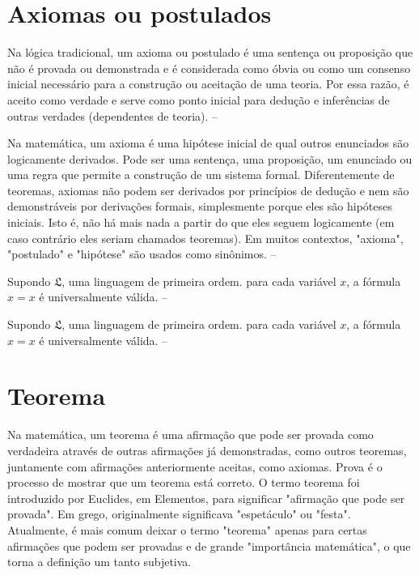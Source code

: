 \section{Axiomas ou postulados}

Na lógica tradicional, um axioma ou postulado é uma sentença ou proposição que não é provada ou demonstrada e é considerada como óbvia ou como um consenso inicial necessário para a construção ou aceitação de uma teoria. Por essa razão, é aceito como verdade e serve como ponto inicial para dedução e inferências de outras verdades (dependentes de teoria). -- \showfont


Na matemática, um axioma é uma hipótese inicial de qual outros enunciados são logicamente derivados. Pode ser uma sentença, uma proposição, um enunciado ou uma regra que permite a construção de um sistema formal. Diferentemente de teoremas, axiomas não podem ser derivados por princípios de dedução e nem são demonstráveis por derivações formais, simplesmente porque eles são hipóteses iniciais. Isto é, não há mais nada a partir do que eles seguem logicamente (em caso contrário eles seriam chamados teoremas). Em muitos contextos, "axioma", "postulado" e "hipótese" são usados como sinônimos. -- \showfont


\begin{axioma}
    Supondo $\mathfrak{L}$, uma linguagem de primeira ordem. para cada variável $x$, a fórmula $x = x$ é universalmente válida. -- \showfont
\end{axioma}


\begin{postulado}
    Supondo $\mathfrak{L}$, uma linguagem de primeira ordem. para cada variável $x$, a fórmula $x = x$ é universalmente válida. -- \showfont
\end{postulado}


\section{Teorema}

Na matemática, um teorema é uma afirmação que pode ser provada como verdadeira através de outras afirmações já demonstradas, como outros teoremas, juntamente com afirmações anteriormente aceitas, como axiomas. Prova é o processo de mostrar que um teorema está correto. O termo teorema foi introduzido por Euclides, em Elementos, para significar "afirmação que pode ser provada". Em grego, originalmente significava "espetáculo" ou "festa". Atualmente, é mais comum deixar o termo "teorema" apenas para certas afirmações que podem ser provadas e de grande "importância matemática", o que torna a definição um tanto subjetiva.

